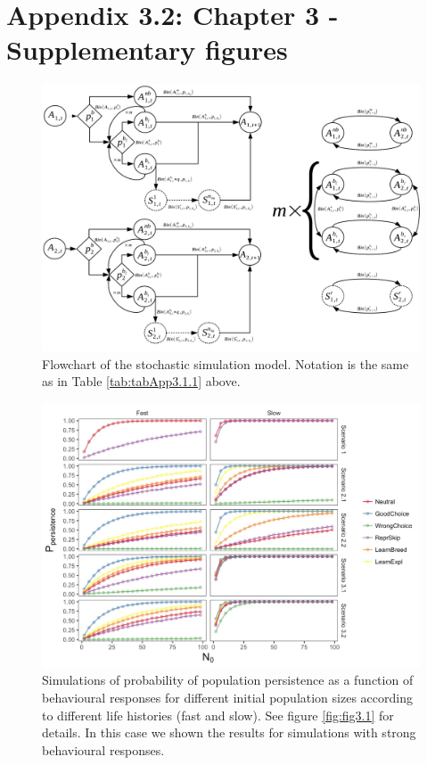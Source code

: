 \chapter[Appendix 3.2: Chapter 3 - Supplementary Figures]{Appendix 3.2: Chapter 3 - Supplementary figures}\label{ch:Appendix3.2}
\renewcommand{\thefigure}{A.3.2.\arabic{figure}}
\setcounter{figure}{0}

\renewcommand{\thetable}{A.3.2.\arabic{table}}
\setcounter{table}{0}

\begin{figure}[ht!]
\centering
\includegraphics[width=\textwidth]{./Figures/Appendix3_2/Fig_1.jpg}
\caption[Flowchart of the model]{
Flowchart of the stochastic simulation model. Notation is the same as in Table
\ref{tab:tabApp3.1.1} above.}
\label{fig:figApp3.2.1}
\end{figure}

\begin{figure}
\centering
\includegraphics[width=\textwidth]{./Figures/Appendix3_2/Fig_2.jpg}
\caption[Persistence with strong behavioural responses]{
Simulations of probability of population persistence as a function
of behavioural responses for different initial population sizes according to
different life histories (fast and slow). See figure \ref{fig:fig3.1} for
details. In this case we shown the results for simulations with strong
behavioural responses.}
\label{fig:figApp3.2.2}
\end{figure}

